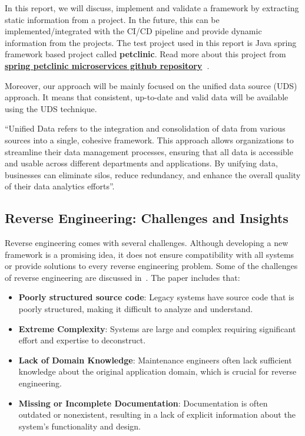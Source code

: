 In this report, we will discuss, implement and validate a framework by extracting static information from a project. In the future, this can be implemented/integrated with the CI/CD pipeline and provide dynamic information from the projects. The test project used in this report is Java spring framework based project called \textbf{petclinic}. Read more about this project from \textbf{\href{https://github.com/spring-petclinic/spring-petclinic-microservices} {spring petclinic microservices github repository}~\citep{spring-petclinic}}.

Moreover, our approach will be mainly focused on the unified data source (UDS) approach. It means that consistent, up-to-date and valid data will be available using the UDS technique. 

\begin{tcolorbox}[colback=gray!10, colframe=gray!20]
	``Unified Data refers to the integration and consolidation of data from various sources into a single, cohesive framework. This approach allows organizations to streamline their data management processes, ensuring that all data is accessible and usable across different departments and applications. By unifying data, businesses can eliminate silos, reduce redundancy, and enhance the overall quality of their data analytics efforts''.~\citep{unifiedData2025}
\end{tcolorbox}

\subsection{Reverse Engineering: Challenges and Insights}
Reverse engineering comes with several challenges. Although developing a new framework is a promising idea, it does not ensure compatibility with all systems or provide solutions to every reverse engineering problem. Some of the challenges of reverse engineering are discussed in~\citep{klosch1996reverse}. The paper includes that:
\begin{itemize}[label=$\bullet$]
	\item \textbf{Poorly structured source code}: Legacy systems have source code that is poorly structured, making it difficult to analyze and understand.
	\item \textbf{Extreme Complexity}: Systems are large and complex requiring significant effort and expertise to deconstruct.
	\item \textbf{Lack of Domain Knowledge}: Maintenance engineers often lack sufficient knowledge about the original application domain, which is crucial for reverse engineering.
	\item \textbf{Missing or Incomplete Documentation}: Documentation is often outdated or nonexistent, resulting in a lack of explicit information about the system's functionality and design.
\end{itemize}

